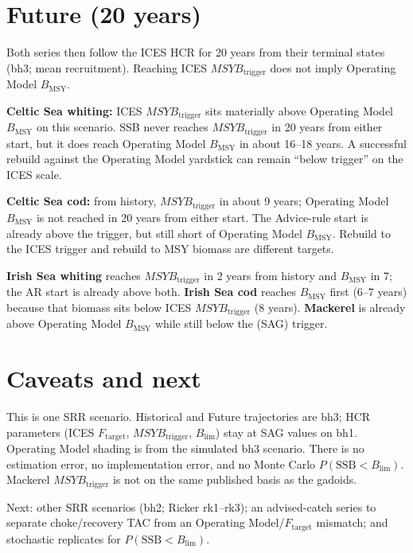 \documentclass[11pt,a4paper]{article}
\newcommand{\Ftar}{F_{\mathrm{target}}}
\newcommand{\Blim}{B_{\lim}}
\newcommand{\Btrig}{MSYB_{\mathrm{trigger}}}
\newcommand{\Bmsy}{B_{\mathrm{MSY}}}
\begin{document}
\section{Future (20 years)}

Both series then follow the ICES HCR for 20 years from their terminal states (bh3; mean recruitment). Reaching ICES $\Btrig$ does not imply Operating Model $\Bmsy$.

\textbf{Celtic Sea whiting:} ICES $\Btrig$ sits materially above Operating Model $\Bmsy$ on this scenario. SSB never reaches $\Btrig$ in 20 years from either start, but it does reach Operating Model $\Bmsy$ in about 16--18 years. A successful rebuild against the Operating Model yardstick can remain ``below trigger'' on the ICES scale.

\textbf{Celtic Sea cod:} from history, $\Btrig$ in about 9 years; Operating Model $\Bmsy$ is not reached in 20 years from either start. The Advice-rule start is already above the trigger, but still short of Operating Model $\Bmsy$. Rebuild to the ICES trigger and rebuild to MSY biomass are different targets.

\textbf{Irish Sea whiting} reaches $\Btrig$ in 2 years from history and $\Bmsy$ in 7; the AR start is already above both. \textbf{Irish Sea cod} reaches $\Bmsy$ first (6--7 years) because that biomass sits below ICES $\Btrig$ (8 years). \textbf{Mackerel} is already above Operating Model $\Bmsy$ while still below the (SAG) trigger.

\section{Caveats and next}

This is one SRR scenario. Historical and Future trajectories are bh3; HCR parameters (ICES $\Ftar$, $\Btrig$, $\Blim$) stay at SAG values on bh1. Operating Model shading is from the simulated bh3 scenario. There is no estimation error, no implementation error, and no Monte Carlo $P(\mathrm{SSB}{<}\Blim)$. Mackerel $\Btrig$ is not on the same published basis as the gadoids.

Next: other SRR scenarios (bh2; Ricker rk1--rk3); an advised-catch series to separate choke/recovery TAC from an Operating Model/$\Ftar$ mismatch; and stochastic replicates for $P(\mathrm{SSB}{<}\Blim)$.
\end{document}
